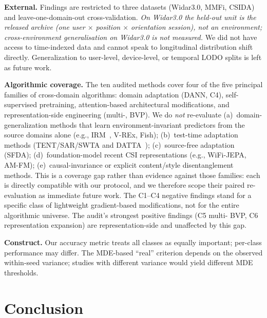 \documentclass[journal,11pt]{IEEEtran}
\newcommand{\CSI}{\text{CSI}}
\newcommand{\LODO}{\text{LODO}}
\newcommand{\Rx}{\text{Rx}}
\begin{document}
\textbf{External.} Findings are restricted to three datasets (Widar3.0, MMFi, CSIDA) and leave-one-domain-out cross-validation. \emph{On Widar3.0 the held-out unit is the released archive (one user $\times$ position $\times$ orientation session), not an environment; cross-environment generalisation on Widar3.0 is not measured.} We did not have access to time-indexed \CSI{} data and cannot speak to longitudinal distribution shift directly. Generalization to user-level, device-level, or temporal LODO splits is left as future work.

\textbf{Algorithmic coverage.} The ten audited methods cover four of the five principal families of cross-domain algorithms: domain adaptation (DANN, C4), self-supervised pretraining, attention-based architectural modifications, and representation-side engineering (multi-\Rx{}, BVP). We do \emph{not} re-evaluate (a)~domain-generalization methods that learn environment-invariant predictors from the source domains alone (e.g., IRM~\cite{arjovsky2019irm}, V-REx, Fish); (b)~test-time adaptation methods (TENT/SAR/SWTA and DATTA~\cite{sterzinger2026datta}); (c)~source-free adaptation (SFDA); (d)~foundation-model recent CSI representations (e.g., WiFi-JEPA, AM-FM); (e)~causal-invariance or explicit content/style disentanglement methods. This is a coverage gap rather than evidence against those families: each is directly compatible with our \LODO{} protocol, and we therefore scope their paired re-evaluation as immediate future work. The C1--C4 negative findings stand for a specific class of lightweight gradient-based modifications, not for the entire algorithmic universe. The audit's strongest positive findings (C5 multi-\Rx{} BVP, C6 representation expansion) are representation-side and unaffected by this gap.

\textbf{Construct.} Our accuracy metric treats all classes as equally important; per-class performance may differ. The MDE-based ``real'' criterion depends on the observed within-seed variance; studies with different variance would yield different MDE thresholds.

\section{Conclusion}
\label{sec:conclusion}
\end{document}
